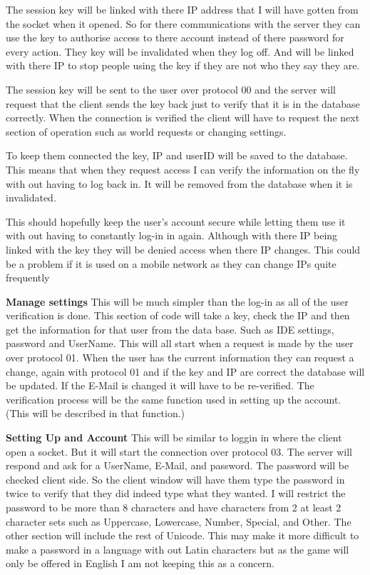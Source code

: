 \documentclass[12pt]{article}
\begin{document}
The session key will be linked with there IP address that I will have gotten from the socket when it opened. So for there communications with the server they can use the key to authorise access to there account instead of there password for every action. They key will be invalidated when they log off. And will be linked with there IP to stop people using the key if they are not who they say they are.

The session key will be sent to the user over protocol 00 and the server will request that the client sends the key back just to verify that it is in the database correctly.
When the connection is verified the client will have to request the next section of operation such as world requests or changing settings.

To keep them connected the key, IP and userID will be saved to the database. This means that when they request access I can verify the information on the fly with out having to log back in. It will be removed from the database when it is invalidated.

This should hopefully keep the user's account secure while letting them use it with out having to constantly log-in in again. Although with there IP being linked with the key they will be denied access when there IP changes. This could be a problem if it is used on a mobile network as they can change IPs quite frequently

\textbf{Manage settings}\newline
This will be much simpler than the log-in as all of the user verification is done. This section of code will take a key, check the IP and then get the information for that user from the data base. Such as IDE settings, password and UserName. This will all start when a request is made by the user over protocol 01. When the user has the current information they can request a change, again with protocol 01 and if the key and IP are correct the database will be updated. If the E-Mail is changed it will have to be re-verified. The verification process will be the same function used in setting up the account. (This will be described in that function.)

\textbf{Setting Up and Account}\newline
This will be similar to loggin in where the client open a socket. But it will start the connection over protocol 03. The server will respond and ask for a UserName, E-Mail, and password. The password will be checked client side. So the client window will have them type the password in twice to verify that they did indeed type what they wanted. I will restrict the password to be more than 8 characters and have characters from 2 at least 2 character sets such as Uppercase, Lowercase, Number, Special, and Other. The other section will include the rest of Unicode. This may make it more difficult to make a password in a language with out Latin characters but as the game will only be offered in English I am not keeping this as a concern.
\end{document}

